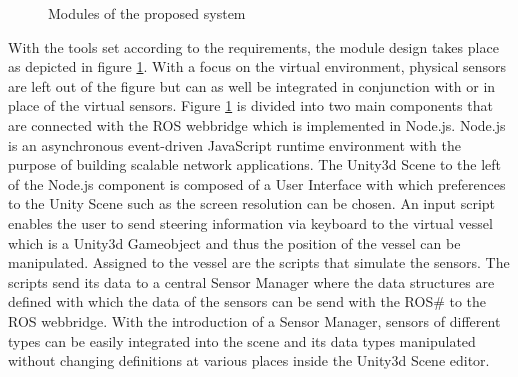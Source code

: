 \begin{figure}[h]
	\caption{Modules of the proposed system}
	\label{fig_modules}
\end{figure}

With the tools set according to the requirements, the module design takes place as depicted in figure \ref{fig_modules}. With a focus on the virtual environment, physical sensors are left out of the figure but can as well be integrated in conjunction with or in place of the virtual sensors. Figure \ref{fig_modules} is divided into two main components that are connected with the \ac{ROS} webbridge which is implemented in Node.js. Node.js is an asynchronous event-driven JavaScript runtime environment with the purpose of building scalable network applications. The Unity3d Scene to the left of the Node.js component is composed of a User Interface with which preferences to the Unity Scene such as the screen resolution can be chosen. An input script enables the user to send steering information via keyboard to the virtual vessel which is a Unity3d Gameobject and thus the position of the vessel can be manipulated. Assigned to the vessel are the scripts that simulate the sensors. The scripts send its data to a central Sensor Manager where the data structures are defined with which the data of the sensors can be send with the ROS\# to the \ac{ROS} webbridge. With the introduction of a Sensor Manager, sensors of different types can be easily integrated into the scene and its data types manipulated without changing definitions at various places inside the Unity3d Scene editor.\\ 

